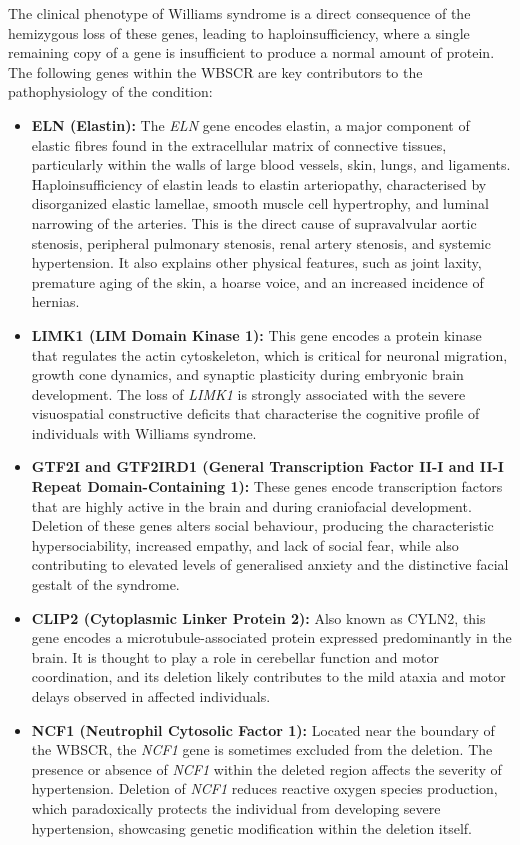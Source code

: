 The clinical phenotype of Williams syndrome is a direct consequence of the hemizygous loss of these genes, leading to haploinsufficiency, where a single remaining copy of a gene is insufficient to produce a normal amount of protein. The following genes within the WBSCR are key contributors to the pathophysiology of the condition:
\begin{itemize}
    \item \textbf{ELN (Elastin):} The \textit{ELN} gene encodes elastin, a major component of elastic fibres found in the extracellular matrix of connective tissues, particularly within the walls of large blood vessels, skin, lungs, and ligaments. Haploinsufficiency of elastin leads to elastin arteriopathy, characterised by disorganized elastic lamellae, smooth muscle cell hypertrophy, and luminal narrowing of the arteries. This is the direct cause of supravalvular aortic stenosis, peripheral pulmonary stenosis, renal artery stenosis, and systemic hypertension. It also explains other physical features, such as joint laxity, premature aging of the skin, a hoarse voice, and an increased incidence of hernias.
    \item \textbf{LIMK1 (LIM Domain Kinase 1):} This gene encodes a protein kinase that regulates the actin cytoskeleton, which is critical for neuronal migration, growth cone dynamics, and synaptic plasticity during embryonic brain development. The loss of \textit{LIMK1} is strongly associated with the severe visuospatial constructive deficits that characterise the cognitive profile of individuals with Williams syndrome.
    \item \textbf{GTF2I and GTF2IRD1 (General Transcription Factor II-I and II-I Repeat Domain-Containing 1):} These genes encode transcription factors that are highly active in the brain and during craniofacial development. Deletion of these genes alters social behaviour, producing the characteristic hypersociability, increased empathy, and lack of social fear, while also contributing to elevated levels of generalised anxiety and the distinctive facial gestalt of the syndrome.
    \item \textbf{CLIP2 (Cytoplasmic Linker Protein 2):} Also known as CYLN2, this gene encodes a microtubule-associated protein expressed predominantly in the brain. It is thought to play a role in cerebellar function and motor coordination, and its deletion likely contributes to the mild ataxia and motor delays observed in affected individuals.
    \item \textbf{NCF1 (Neutrophil Cytosolic Factor 1):} Located near the boundary of the WBSCR, the \textit{NCF1} gene is sometimes excluded from the deletion. The presence or absence of \textit{NCF1} within the deleted region affects the severity of hypertension. Deletion of \textit{NCF1} reduces reactive oxygen species production, which paradoxically protects the individual from developing severe hypertension, showcasing genetic modification within the deletion itself.
\end{itemize}

